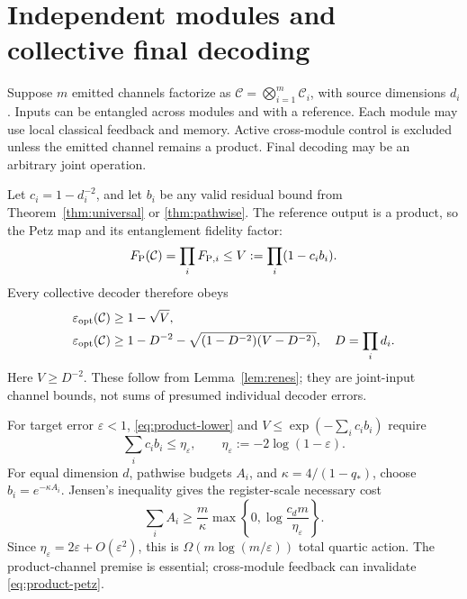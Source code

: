 \documentclass[11pt]{article}
\numberwithin{equation}{section}
\theoremstyle{remark}
\newcommand{\Ccal}{\mathcal C}
\newcommand{\eps}{\varepsilon}
\begin{document}
\section{Independent modules and collective final decoding}
\label{sec:modules}
Suppose \(m\) emitted channels factorize as
\(\Ccal=\bigotimes_{i=1}^m\Ccal_i\), with source dimensions \(d_i\).
Inputs can be entangled across modules and with a reference. Each module
may use local classical feedback and memory. Active cross-module control is
excluded unless the emitted channel remains a product. Final decoding may
be an arbitrary joint operation.

Let \(c_i=1-d_i^{-2}\), and let \(b_i\) be any valid residual bound from
Theorem~\ref{thm:universal} or \ref{thm:pathwise}. The reference output is a
product, so the Petz map and its entanglement fidelity factor:
\begin{equation}
 F_{\rm P}(\Ccal)=\prod_iF_{{\rm P},i}
       \le V:=\prod_i(1-c_i b_i).
 \label{eq:product-petz}
\end{equation}
Every collective decoder therefore obeys
\begin{align}
 \eps_{\rm opt}(\Ccal)&\ge1-\sqrt V,                 \label{eq:product-lower}\\
 \eps_{\rm opt}(\Ccal)&\ge
 1-D^{-2}-\sqrt{(1-D^{-2})(V-D^{-2})},
 \quad D=\prod_i d_i.                              \label{eq:product-sharp}
\end{align}
Here \(V\ge D^{-2}\). These follow from Lemma~\ref{lem:renes}; they are
joint-input channel bounds, not sums of presumed individual decoder errors.

For target error \(\eps<1\), \eqref{eq:product-lower} and
\(V\le\exp(-\sum_i c_i b_i)\) require
\begin{equation}
 \sum_i c_i b_i\le\eta_\eps,\qquad
 \eta_\eps:=-2\log(1-\eps).
 \label{eq:module-necessary}
\end{equation}
For equal dimension \(d\), pathwise budgets \(A_i\), and
\(\kappa=4/(1-q_*)\), choose \(b_i=e^{-\kappa A_i}\).
Jensen's inequality gives the register-scale necessary cost
\begin{equation}
 \sum_i A_i\ge\frac m\kappa
       \max\left\{0,\log\frac{c_dm}{\eta_\eps}\right\}.
 \label{eq:module-action}
\end{equation}
Since \(\eta_\eps=2\eps+O(\eps^2)\), this is
\(\Omega(m\log(m/\eps))\) total quartic action. The product-channel premise
is essential; cross-module feedback can invalidate \eqref{eq:product-petz}.
\end{document}
